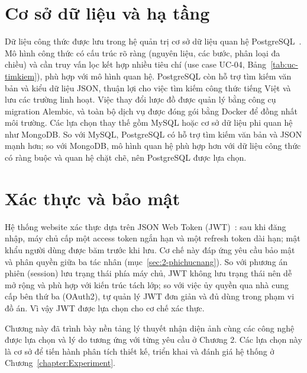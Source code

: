 \documentclass[../DoAn.tex]{subfiles}
\begin{document}
\section{Cơ sở dữ liệu và hạ tầng}
\label{sec:3-data}
Dữ liệu công thức được lưu trong hệ quản trị cơ sở dữ liệu quan hệ PostgreSQL~\cite{postgresql}. Mô hình công thức có cấu trúc rõ ràng (nguyên liệu, các bước, phân loại đa chiều) và cần truy vấn lọc kết hợp nhiều tiêu chí (use case UC-04, Bảng~\ref{tab:uc-timkiem}), phù hợp với mô hình quan hệ. PostgreSQL còn hỗ trợ tìm kiếm văn bản và kiểu dữ liệu JSON, thuận lợi cho việc tìm kiếm công thức tiếng Việt và lưu các trường linh hoạt. Việc thay đổi lược đồ được quản lý bằng công cụ migration Alembic, và toàn bộ dịch vụ được đóng gói bằng Docker để đồng nhất môi trường. Các lựa chọn thay thế gồm MySQL hoặc cơ sở dữ liệu phi quan hệ như MongoDB. So với MySQL, PostgreSQL có hỗ trợ tìm kiếm văn bản và JSON mạnh hơn; so với MongoDB, mô hình quan hệ phù hợp hơn với dữ liệu công thức có ràng buộc và quan hệ chặt chẽ, nên PostgreSQL được lựa chọn.

\section{Xác thực và bảo mật}
\label{sec:3-baomat}
Hệ thống website xác thực dựa trên JSON Web Token (JWT)~\cite{rfc7519}: sau khi đăng nhập, máy chủ cấp một access token ngắn hạn và một refresh token dài hạn; mật khẩu người dùng được băm trước khi lưu. Cơ chế này đáp ứng yêu cầu bảo mật và phân quyền giữa ba tác nhân (mục~\ref{sec:2-phichucnang}). So với phương án phiên (session) lưu trạng thái phía máy chủ, JWT không lưu trạng thái nên dễ mở rộng và phù hợp với kiến trúc tách lớp; so với việc ủy quyền qua nhà cung cấp bên thứ ba (OAuth2), tự quản lý JWT đơn giản và đủ dùng trong phạm vi đồ án. Vì vậy JWT được lựa chọn cho cơ chế xác thực.

Chương này đã trình bày nền tảng lý thuyết nhận diện ảnh cùng các công nghệ được lựa chọn và lý do tương ứng với từng yêu cầu ở Chương 2. Các lựa chọn này là cơ sở để tiến hành phân tích thiết kế, triển khai và đánh giá hệ thống ở Chương~\ref{chapter:Experiment}.
\end{document}
